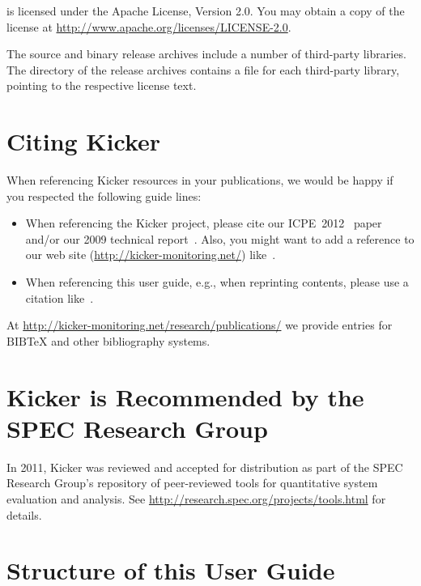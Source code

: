 \Kicker{} is licensed under the Apache License, Version 2.0. You may obtain a copy of %
the license at \url{http://www.apache.org/licenses/LICENSE-2.0}.

The \Kicker{} source and binary release archives include a number of third-party %
libraries. %
The  directory of the release archives contains a %
 file for each third-party library, pointing to the respective license text.

\section{Citing Kicker}\label{sec:ch1:citingKicker}

When referencing Kicker resources in your publications, we would be happy if you %
respected the following guide lines:

\begin{itemize}
\item When referencing the Kicker project, please cite our %
ICPE~2012~\cite{KickerICPE2012} paper and/or our 2009 technical report~\cite{vanHoornRohrHasselbringWallerEhlersFreyKieselhorst2009TRContinuousMonitoringOfSoftwareServicesDesignAndApplicationOfTheKickerFramework}. %
Also, you might want to add a reference to our web site (\url{http://kicker-monitoring.net/}) %
like~\cite{KickerWebSite}. 
\item When referencing this user guide, e.g., when reprinting contents, please %
use a citation like~\cite{KickerUserGuideThis}.
\end{itemize}

\noindent At \url{http://kicker-monitoring.net/research/publications/} we provide %
entries for $\mathrm{B\scriptstyle IB}\!$\TeX{} and other bibliography %
systems.

\section{Kicker is Recommended by the SPEC Research Group}

In 2011, Kicker was reviewed and accepted for distribution as part of the SPEC Research %
Group's repository of peer-reviewed tools for quantitative system evaluation and analysis. %
See \url{http://research.spec.org/projects/tools.html} for details.

\section{Structure of this User Guide}

